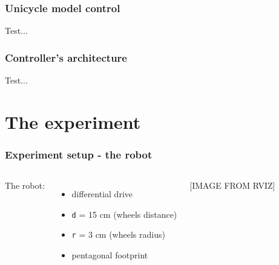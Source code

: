 \documentclass{beamer}
\begin{document}
\begin{frame}
\frametitle{Unicycle model control}

Test...

\end{frame}


\begin{frame}
\frametitle{Controller's architecture}

Test...

\end{frame}




\section{The experiment}


\begin{frame}
\frametitle{Experiment setup - the robot}

\begin{columns}


The robot:
\begin{itemize}
  \item differential drive
  \item \texttt{d} = 15 cm (wheels distance)
  \item \texttt{r} = 3 cm (wheels radius)
  \item pentagonal footprint
\end{itemize}



[IMAGE FROM RVIZ]

\end{columns}

\end{frame}

\end{document}
